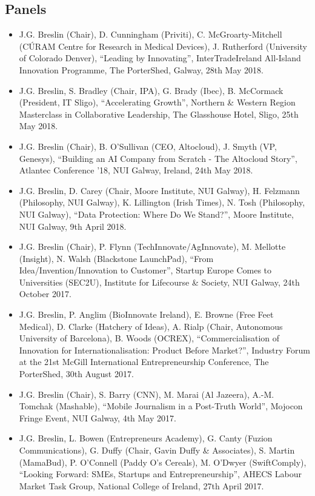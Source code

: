 \documentclass[10pt,a4paper]{res} %
\begin{document}
\begin{resume}
\subsection*{Panels}

\begin{itemize} \itemsep -2pt
\item J.G. Breslin (Chair), D. Cunningham (Priviti), C. McGroarty-Mitchell (C\'{U}RAM Centre for Research in Medical Devices), J. Rutherford (University of Colorado Denver), ``Leading by Innovating'', InterTradeIreland All-Island Innovation Programme, The PorterShed, Galway, 28th May 2018.
\item J.G. Breslin, S. Bradley (Chair, IPA), G. Brady (Ibec), B. McCormack (President, IT Sligo), ``Accelerating Growth'', Northern \& Western Region Masterclass in Collaborative Leadership, The Glasshouse Hotel, Sligo, 25th May 2018.
\item J.G. Breslin (Chair), B. O'Sullivan (CEO, Altocloud), J. Smyth (VP, Genesys), ``Building an AI Company from Scratch - The Altocloud Story'', Atlantec Conference '18, NUI Galway, Ireland, 24th May 2018.
\item J.G. Breslin, D. Carey (Chair, Moore Institute, NUI Galway), H. Felzmann (Philosophy, NUI Galway), K. Lillington (Irish Times), N. Tosh (Philosophy, NUI Galway), ``Data Protection: Where Do We Stand?'', Moore Institute, NUI Galway, 9th April 2018.
\item J.G. Breslin (Chair), P. Flynn (TechInnovate/AgInnovate), M. Mellotte (Insight), N. Walsh (Blackstone LaunchPad), ``From Idea/Invention/Innovation to Customer'', Startup Europe Comes to Universities (SEC2U), Institute for Lifecourse \& Society, NUI Galway, 24th October 2017.
\item J.G. Breslin, P. Anglim (BioInnovate Ireland), E. Browne (Free Feet Medical), D. Clarke (Hatchery of Ideas), A. Rialp (Chair, Autonomous University of Barcelona), B. Woods (OCREX), ``Commercialisation of Innovation for Internationalisation: Product Before Market?'', Industry Forum at the 21st McGill International Entrepreneurship Conference, The PorterShed, 30th August 2017.
\item J.G. Breslin (Chair), S. Barry (CNN), M. Marai (Al Jazeera), A.-M. Tomchak (Mashable), ``Mobile Journalism in a Post-Truth World'', Mojocon Fringe Event, NUI Galway, 4th May 2017.
\item J.G. Breslin, L. Bowen (Entrepreneurs Academy), G. Canty (Fuzion Communications), G. Duffy (Chair, Gavin Duffy \& Associates), S. Martin (MamaBud), P. O'Connell (Paddy O's Cereals), M. O'Dwyer (SwiftComply), ``Looking Forward: SMEs, Startups and Entrepreneurship'', AHECS Labour Market Task Group, National College of Ireland, 27th April 2017.

\end{itemize}
\end{resume}
\end{document}
